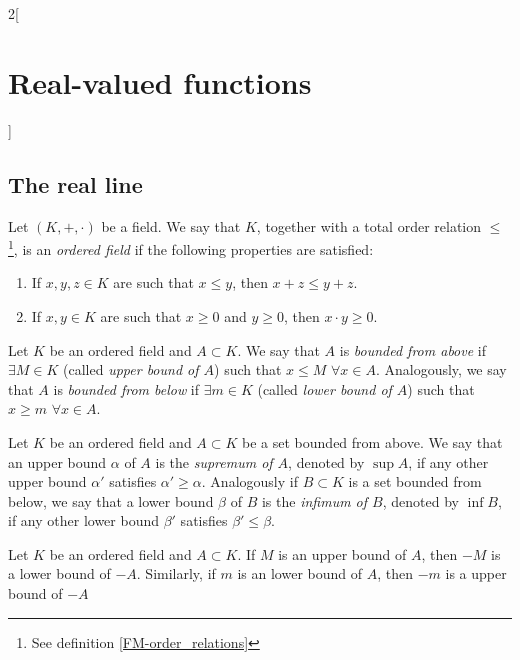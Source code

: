 \documentclass[../../../main.tex]{subfiles}
\begin{document}
\begin{multicols}{2}[\section{Real-valued functions}]
    \subsection{The real line}
    \begin{definition}
        Let $(K,+,\cdot)$ be a field. We say that $K$, together with a total order relation $\leq$\footnote{See definition \ref{FM-order_relations}}, is an \textit{ordered field} if the following properties are satisfied:
        \begin{enumerate}
            \item If $x,y,z\in K$ are such that $x\leq y$, then $x+z\leq y+z$.
            \item If $x,y\in K$ are such that $x\geq0$ and $y\geq0$, then $x\cdot y\geq 0$.
        \end{enumerate}
    \end{definition}
    \begin{definition}
        Let $K$ be an ordered field and $A\subset K$. We say that $A$ is \textit{bounded from above} if $\exists M\in K$ (called \textit{upper bound of $A$}) such that $x\leq M$ $\forall x\in A$. Analogously, we say that $A$ is \textit{bounded from below} if $\exists m\in K$ (called \textit{lower bound of $A$}) such that $x\geq m$ $\forall x\in A$.
    \end{definition}
    \begin{definition}
        Let $K$ be an ordered field and $A\subset K$ be a set bounded from above. We say that an upper bound $\alpha$ of $A$ is the \textit{supremum of $A$}, denoted by $\sup A$, if any other upper bound $\alpha'$ satisfies $\alpha'\geq\alpha$.
        Analogously if $B\subset K$ is a set bounded from below, we say that a lower bound $\beta$ of $B$ is the \textit{infimum of $B$}, denoted by $\inf B$, if any other lower bound $\beta'$ satisfies $\beta'\leq\beta$.
    \end{definition}
    \begin{prop}
        Let $K$ be an ordered field and $A\subset K$. If $M$ is an upper bound of $A$, then $-M$ is a lower bound of $-A$. Similarly, if $m$ is an lower bound of $A$, then $-m$ is a upper bound of $-A$
    \end{prop}
    \begin{prop}

\end{prop}
\end{multicols}
\end{document}
